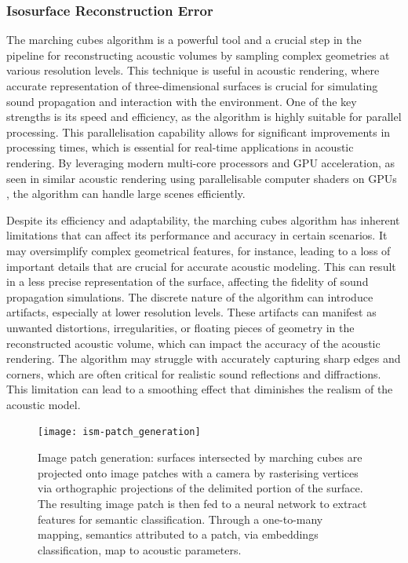 \subsubsection{Isosurface Reconstruction Error}\label{sec:marching-cubes-error}
The marching cubes algorithm is a powerful tool and a crucial step in the pipeline for reconstructing acoustic volumes by sampling complex geometries at various resolution levels. This technique is useful in acoustic rendering, where accurate representation of three-dimensional surfaces is crucial for simulating sound propagation and interaction with the environment.
One of the key strengths is its speed and efficiency, as the algorithm is highly suitable for parallel processing. This parallelisation capability allows for significant improvements in processing times, which is essential for real-time applications in acoustic rendering. By leveraging modern multi-core processors and GPU acceleration, as seen in similar acoustic rendering using parallelisable computer shaders on GPUs \citep{savioja2010use}, the algorithm can handle large scenes efficiently.\par
Despite its efficiency and adaptability, the marching cubes algorithm has inherent limitations that can affect its performance and accuracy in certain scenarios. It may oversimplify complex geometrical features, for instance, leading to a loss of important details that are crucial for accurate acoustic modeling. This can result in a less precise representation of the surface, affecting the fidelity of sound propagation simulations. The discrete nature of the algorithm can introduce artifacts, especially at lower resolution levels. These artifacts can manifest as unwanted distortions, irregularities, or floating pieces of geometry in the reconstructed acoustic volume, which can impact the accuracy of the acoustic rendering. The algorithm may struggle with accurately capturing sharp edges and corners, which are often critical for realistic sound reflections and diffractions. This limitation can lead to a smoothing effect that diminishes the realism of the acoustic model.\par


\begin{figure}[htb]
    \centering 
    \texttt{[image: ism-patch\_generation]}
    \caption[ISM Acoustic Rendering --- surface patch generation diagram]{Image patch generation: surfaces intersected by marching cubes are projected onto image patches with a camera by rasterising vertices via orthographic projections of the delimited portion of the surface. The resulting image patch is then fed to a neural network to extract features for semantic classification. Through a one-to-many mapping, semantics attributed to a patch, via embeddings classification, map to acoustic parameters.}
\label{fig:ism-patch_generation}
\end{figure}

